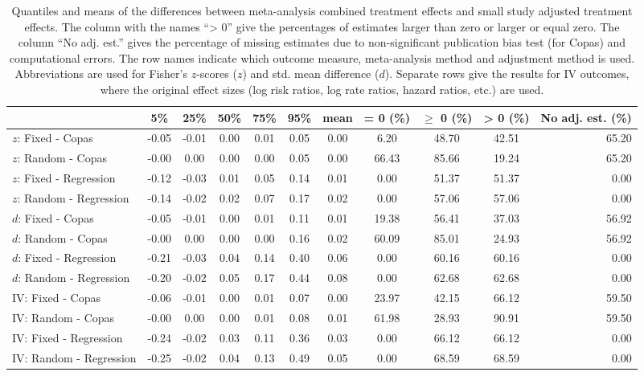 \documentclass[11pt,a4paper,twoside]{book}\usepackage[]{graphicx}\usepackage[]{color}
\begin{document}
\begin{table}[ht]
\centering
\begingroup\scriptsize
\begin{tabular}{lcccccccccr}
  \hline
 & 5\% & 25\% & 50\% & 75\% & 95\% & mean & = 0 (\%) & $\geq$ 0 (\%) & > 0 (\%) & No adj. est. (\%) \\ 
  \hline
$z$: Fixed - Copas & -0.05 & -0.01 & 0.00 & 0.01 & 0.05 & 0.00 & 6.20 & 48.70 & 42.51 & 65.20 \\ 
  $z$: Random - Copas & -0.00 & 0.00 & 0.00 & 0.00 & 0.05 & 0.00 & 66.43 & 85.66 & 19.24 & 65.20 \\ 
  $z$: Fixed - Regression & -0.12 & -0.03 & 0.01 & 0.05 & 0.14 & 0.01 & 0.00 & 51.37 & 51.37 & 0.00 \\ 
  $z$: Random - Regression & -0.14 & -0.02 & 0.02 & 0.07 & 0.17 & 0.02 & 0.00 & 57.06 & 57.06 & 0.00 \\ 
  $d$: Fixed - Copas & -0.05 & -0.01 & 0.00 & 0.01 & 0.11 & 0.01 & 19.38 & 56.41 & 37.03 & 56.92 \\ 
  $d$: Random - Copas & -0.00 & 0.00 & 0.00 & 0.00 & 0.16 & 0.02 & 60.09 & 85.01 & 24.93 & 56.92 \\ 
  $d$: Fixed - Regression & -0.21 & -0.03 & 0.04 & 0.14 & 0.40 & 0.06 & 0.00 & 60.16 & 60.16 & 0.00 \\ 
  $d$: Random - Regression & -0.20 & -0.02 & 0.05 & 0.17 & 0.44 & 0.08 & 0.00 & 62.68 & 62.68 & 0.00 \\ 
  IV: Fixed - Copas & -0.06 & -0.01 & 0.00 & 0.01 & 0.07 & 0.00 & 23.97 & 42.15 & 66.12 & 59.50 \\ 
  IV: Random - Copas & -0.00 & 0.00 & 0.00 & 0.01 & 0.08 & 0.01 & 61.98 & 28.93 & 90.91 & 59.50 \\ 
  IV: Fixed - Regression & -0.24 & -0.02 & 0.03 & 0.11 & 0.36 & 0.03 & 0.00 & 66.12 & 66.12 & 0.00 \\ 
  IV: Random - Regression & -0.25 & -0.02 & 0.04 & 0.13 & 0.49 & 0.05 & 0.00 & 68.59 & 68.59 & 0.00 \\ 
   \hline
\end{tabular}
\endgroup
\caption{Quantiles and means of the differences between meta-analysis combined treatment effects and small study adjusted treatment effects. The column with the names ``> 0'' give the percentages of estimates larger than zero or larger or equal zero. The column ``No adj. est.'' gives the percentage of missing estimates due to non-significant publication bias test (for Copas) and computational errors. The row names indicate which outcome measure, meta-analysis method and adjustment method is used. Abbreviations are used for Fisher's $z$-scores ($z$) and std. mean difference ($d$). Separate rows give the results for IV outcomes, where the original effect sizes (log risk ratios, log rate ratios, hazard ratios, etc.) are used.} 
\label{adjustment.difference}
\end{table}
\end{document}
